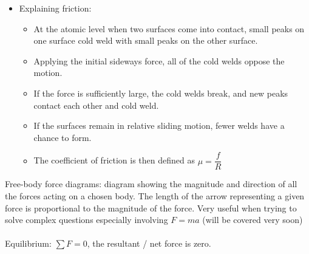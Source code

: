 \documentclass[a4paper,12pt]{article}
\begin{document}
\begin{itemize}
\begin{itemize}
	\item Explaining friction:
	\begin{itemize}
	    \item At the atomic level when two surfaces come into contact, small peaks on one surface cold weld with small peaks on the other surface.
	    \item Applying the initial sideways force, all of the cold welds oppose the motion.
	    \item If the force is sufficiently large, the cold welds break, and new peaks contact each other and cold weld.
	    \item If the surfaces remain in relative sliding motion, fewer welds have a chance to form.
	    \item The coefficient of friction is then defined as $\mu=\dfrac{f}{R}$
	    \end{itemize}
\end{itemize}
  \end{itemize}
Free-body force diagrams: diagram showing the magnitude and direction of all the forces acting on a chosen body. The length of the arrow representing a given force is proportional to the magnitude of the force. Very useful when trying to solve complex questions especially involving $F=ma$ (will be covered very soon)\\\\
Equilibrium: $\displaystyle \sum F=0$, the resultant / net force is zero.
\end{document}
